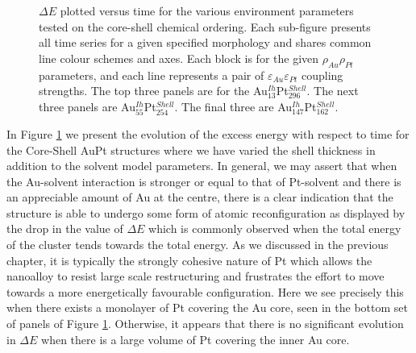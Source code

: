 \begin{figure}
\begin{subfigure}[b]{0.8\textwidth}
\end{subfigure}
    \caption{$\Delta E$ plotted versus time for the various environment parameters tested on the core-shell chemical ordering. Each sub-figure presents all time series for a given specified morphology and shares common line colour schemes and axes. Each block is for the given $\rho_{Au}\rho_{Pt}$ parameters, and each line represents a pair of $\varepsilon_{Au}\varepsilon_{Pt}$ coupling strengths. The top three panels are for the Au$_{13}^{Ih}$Pt$_{296}^{Shell}$. The next three panels are Au$_{55}^{Ih}$Pt$_{254}^{Shell}$. The final three are Au$_{147}^{Ih}$Pt$_{162}^{Shell}$. }
    \label{fig:Delta_E_Env_CS}
\end{figure}

In Figure \ref{fig:Delta_E_Env_CS} we present the evolution of the excess energy with respect to time for the Core-Shell AuPt structures where we have varied the shell thickness in addition to the solvent model parameters. In general, we may assert that when the Au-solvent interaction is stronger or equal to that of Pt-solvent and there is an appreciable amount of Au at the centre, there is a clear indication that the structure is able to undergo some form of atomic reconfiguration as displayed by the drop in the value of $\Delta E$ which is commonly observed when the total energy of the cluster tends towards the total energy. As we discussed in the previous chapter, it is typically the strongly cohesive nature of Pt which allows the nanoalloy to resist large scale restructuring and frustrates the effort to move towards a more energetically favourable configuration. Here we see precisely this when there exists a monolayer of Pt covering the Au core, seen in the bottom set of panels of Figure \ref{fig:Delta_E_Env_CS}. Otherwise, it appears that there is no significant evolution in $\Delta E$ when there is a large volume of Pt covering the inner Au core. 

